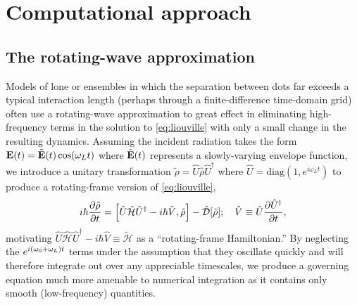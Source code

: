 \section{Computational approach}

\subsection{The rotating-wave approximation}

Models of lone \qds{} or \qd{} ensembles in which the separation between dots far exceeds a typical interaction length (perhaps through a finite-difference time-domain grid) often use a rotating-wave approximation to great effect in eliminating high-frequency terms in the solution to \cref{eq:liouville} with only a small change in the resulting dynamics.
Assuming the incident radiation takes the form $\vb{E}(t) = \tilde{\vb{E}}(t) \cos(\omega_L t)$
where $\tilde{\vb{E}}(t)$ represents a slowly-varying envelope function, we introduce a unitary transformation $\tilde{\rho} = \hat{U} \hat{\rho} \hat{U}^\dagger$ where $\hat{U} = \mathrm{diag}(1, e^{i \omega_L t})$ to produce a rotating-frame version of \cref{eq:liouville},
\begin{equation}
  i \hbar \pdv{\tilde{\rho}}{t} = \commutator{\hat{U} \hat{\mathcal{H}} \hat{U}^\dagger - i \hbar \hat{V}}{\tilde{\rho}} - \hat{\mathcal{D}}\qty[\tilde{\rho}]; \quad \hat{V} \equiv \hat{U} \pdv{\hat{U}^\dagger}{t},
  \label{eq:rotating liouville}
\end{equation}
motivating $\hat{U} \hat{\mathcal{H}} \hat{U}^\dagger - i \hbar \hat{V} \equiv \tilde{\mathcal{H}}$ as a ``rotating-frame Hamiltonian.''
By neglecting the $e^{i \qty(\omega_0 + \omega_L) t}$ terms under the assumption that they oscillate quickly and will therefore integrate out over any appreciable timescales, we produce a governing equation much more amenable to numerical integration as it contains only smooth (low-frequency) quantities.


